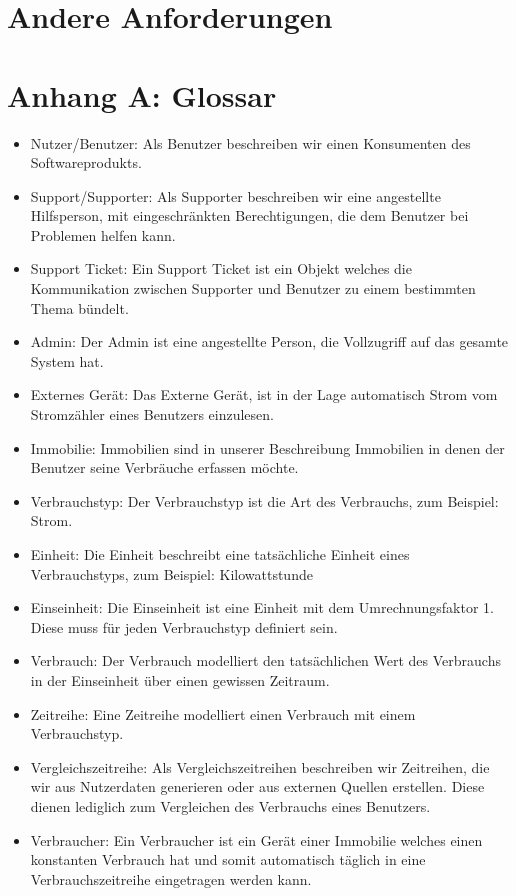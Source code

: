 \section{Andere Anforderungen}
\section*{Anhang A: Glossar}
\label{glossar}
\begin{itemize}
\item Nutzer/Benutzer: Als Benutzer beschreiben wir einen Konsumenten des Softwareprodukts.
\item Support/Supporter: Als Supporter beschreiben wir eine angestellte Hilfsperson, mit eingeschränkten Berechtigungen, die dem Benutzer bei Problemen helfen kann.
\item Support Ticket: Ein Support Ticket ist ein Objekt welches die Kommunikation zwischen Supporter und Benutzer zu einem bestimmten Thema bündelt.
\item Admin: Der Admin ist eine angestellte Person, die Vollzugriff auf das gesamte System hat.
\item Externes Gerät: Das Externe Gerät, ist in der Lage automatisch Strom vom Stromzähler eines Benutzers einzulesen.
\item Immobilie: Immobilien sind in unserer Beschreibung Immobilien in denen der Benutzer seine Verbräuche erfassen möchte.
\item Verbrauchstyp: Der Verbrauchstyp ist die Art des Verbrauchs, zum Beispiel: Strom.
\item Einheit: Die Einheit beschreibt eine tatsächliche Einheit eines Verbrauchstyps, zum Beispiel: Kilowattstunde
\item Einseinheit: Die Einseinheit ist eine Einheit mit dem Umrechnungsfaktor 1. Diese muss für jeden Verbrauchstyp definiert sein.
\item Verbrauch: Der Verbrauch modelliert den tatsächlichen Wert des Verbrauchs in der Einseinheit über einen gewissen Zeitraum.
\item Zeitreihe: Eine Zeitreihe modelliert einen Verbrauch mit einem Verbrauchstyp.
\item Vergleichszeitreihe: Als Vergleichszeitreihen beschreiben wir Zeitreihen, die wir aus Nutzerdaten generieren oder aus externen Quellen erstellen. Diese dienen lediglich zum Vergleichen des Verbrauchs eines Benutzers.
\item Verbraucher: Ein Verbraucher ist ein Gerät einer Immobilie welches einen konstanten Verbrauch hat und somit automatisch täglich in eine Verbrauchszeitreihe eingetragen werden kann.
\end{itemize}
